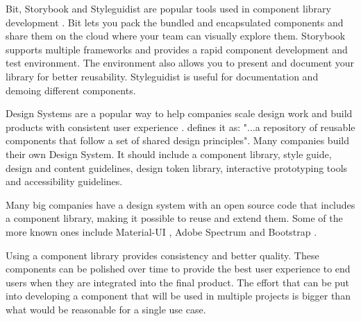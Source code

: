 \documentclass{master_thesis}
\begin{document}
Bit, Storybook and Styleguidist are popular tools used in component library development \citep{Ella2019}. Bit lets you pack the bundled and encapsulated components and share them on the cloud where your team can visually explore them. Storybook supports multiple frameworks and provides a rapid component development and test environment. The environment also allows you to present and document your library for better reusability. Styleguidist is useful for documentation and demoing different components.

Design Systems are a popular way to help companies scale design work and build products with consistent user experience \citep{Yew2020}. \citeauthor{Yew2020} defines it as: "...a repository of reusable components that follow a set of shared design principles". Many companies build their own Design System. It should include a component library, style guide, design and content guidelines, design token library, interactive prototyping tools and accessibility guidelines.

Many big companies have a design system with an open source code that includes a component library, making it possible to reuse and extend them. Some of the more known ones include Material-UI \citep{MUS}, Adobe Spectrum \citep{Adobe} and Bootstrap \citep{Collings}.




Using a component library provides consistency and better quality. These components can be polished over time to provide the best user experience to end users when they are integrated into the final product. The effort that can be put into developing a component that will be used in multiple projects is bigger than what would be reasonable for a single use case.
\end{document}
